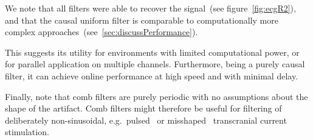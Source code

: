 \documentclass[a4paper]{article}
\newcommand{\figref}[1]{(see figure~\ref{#1})}
\newcommand{\secref}[1]{(see~\ref{#1})}
\begin{document}
We note that all filters were able to recover the signal~\figref{fig:ecgR2}, and that the causal uniform filter is comparable to computationally more complex approaches~\secref{sec:discussPerformance}.

This suggests its utility for environments with limited computational power, or for parallel application on multiple channels.
Furthermore, being a purely causal filter, it can achieve online performance at high speed and with minimal delay.

Finally, note that comb filters are purely periodic with no assumptions about the shape of the artifact. Comb filters might therefore be useful for filtering of deliberately non-sinusoidal, e.g.\ pulsed~\citep{Jaberzadeh_2015} or misshaped~\citep{Cole_2017} transcranial current stimulation.



\end{document}
